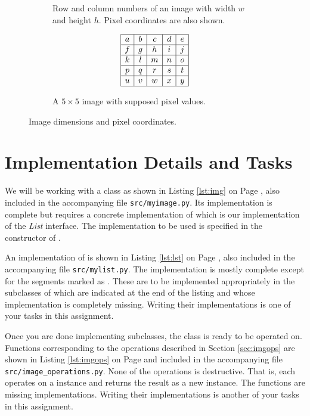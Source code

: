 \documentclass[addpoints]{exam}
\begin{document}
\begin{figure}
\begin{subfigure}{.65\textwidth}
    \caption{Row and column numbers of an image with width $w$ and height $h$. Pixel coordinates are also shown.}\label{fig:img-dim}
  \end{subfigure}
  \begin{subfigure}{.3\textwidth}
    \[
      \begin{array}{|*{5}{c|}}
        \hline
        a & b & c & d & e \\\hline
        f & g & h & i & j \\\hline
        k & l & m & n & o \\\hline
        p & q & r & s & t \\\hline
        u & v & w & x & y \\\hline
      \end{array}
    \]
    \caption{A $5\times 5$ image with supposed pixel values.}\label{fig:img-rgb}
  \end{subfigure}
  \caption{Image dimensions and pixel coordinates.}
  \label{fig:img}
\end{figure}
\newpage
\section{Implementation Details and Tasks}

We will be working with a  class as shown in Listing \ref{lst:img} on Page \pageref{lst:img}, also included in the accompanying file \texttt{src/myimage.py}. Its implementation is complete but requires a concrete implementation of  which is our implementation of the \textit{List} interface. The implementation to be used is specified in the constructor of .

An implementation of  is shown in Listing \ref{lst:lst} on Page \pageref{lst:lst}, also included in the accompanying file \texttt{src/mylist.py}. The implementation is mostly complete except for the segments marked as . These are to be implemented appropriately in the subclasses of  which are indicated at the end of the listing and whose implementation is completely missing. Writing their implementations is one of your tasks in this assignment.

Once you are done implementing  subclasses, the  class is ready to be operated on. Functions corresponding to the operations described in Section \ref{sec:imgops} are shown in Listing \ref{lst:imgops} on Page \pageref{lst:imgops} and included in the accompanying file \texttt{src/image\_operations.py}. None of the operations is destructive. That is, each operates on a  instance and returns the result as a new  instance. The functions are missing implementations. Writing their implementations is another of your tasks in this assignment.
\end{document}
